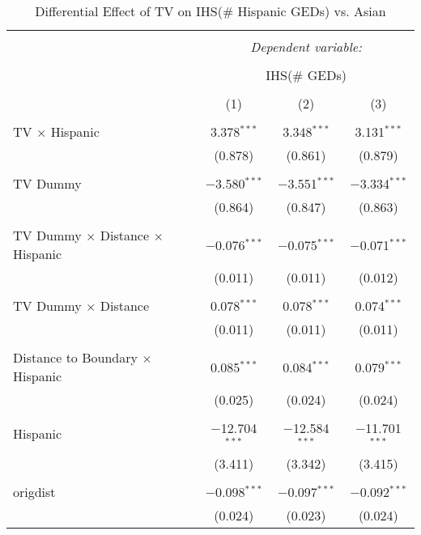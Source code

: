 
\begin{table}[!htbp] \centering 
  \caption{Differential Effect of TV on IHS(\# Hispanic GEDs) vs. Asian} 
  \label{} 
\begin{tabular}{@{\extracolsep{-2pt}}lccc} 
\\[-1.8ex]\hline 
\hline \\[-1.8ex] 
 & \multicolumn{3}{c}{\textit{Dependent variable:}} \\ 
\cline{2-4} 
\\[-1.8ex] & \multicolumn{3}{c}{IHS(\# GEDs)} \\ 
\\[-1.8ex] & (1) & (2) & (3)\\ 
\hline \\[-1.8ex] 
 TV $\times$ Hispanic & 3.378$^{***}$ & 3.348$^{***}$ & 3.131$^{***}$ \\ 
  & (0.878) & (0.861) & (0.879) \\ 
  & & & \\ 
 TV Dummy & $-$3.580$^{***}$ & $-$3.551$^{***}$ & $-$3.334$^{***}$ \\ 
  & (0.864) & (0.847) & (0.863) \\ 
  & & & \\ 
 TV Dummy $\times$ Distance $\times$ Hispanic & $-$0.076$^{***}$ & $-$0.075$^{***}$ & $-$0.071$^{***}$ \\ 
  & (0.011) & (0.011) & (0.012) \\ 
  & & & \\ 
 TV Dummy $\times$ Distance & 0.078$^{***}$ & 0.078$^{***}$ & 0.074$^{***}$ \\ 
  & (0.011) & (0.011) & (0.011) \\ 
  & & & \\ 
 Distance to Boundary $\times$ Hispanic & 0.085$^{***}$ & 0.084$^{***}$ & 0.079$^{***}$ \\ 
  & (0.025) & (0.024) & (0.024) \\ 
  & & & \\ 
 Hispanic & $-$12.704$^{***}$ & $-$12.584$^{***}$ & $-$11.701$^{***}$ \\ 
  & (3.411) & (3.342) & (3.415) \\ 
  & & & \\ 
 origdist & $-$0.098$^{***}$ & $-$0.097$^{***}$ & $-$0.092$^{***}$ \\ 
  & (0.024) & (0.023) & (0.024) \\ 

\end{tabular}
\end{table}
